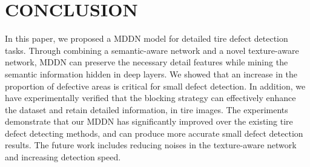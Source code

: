 \documentclass{article}
\begin{document}

%
%
%




\section{CONCLUSION}
\label{sec:typestyle}

In this paper, we proposed a MDDN model for detailed tire defect detection tasks. Through combining a semantic-aware network and a novel texture-aware network, MDDN can preserve the necessary detail features while mining the semantic information hidden in deep layers. We showed that an increase in the proportion of defective areas is critical for small defect detection. In addition, we have experimentally verified that the blocking strategy can effectively enhance the dataset and retain detailed information, in tire images. The experiments demonstrate that our MDDN has significantly improved over the existing tire defect detecting methods, and can produce more accurate small defect detection results. The future work includes reducing noises in the texture-aware network and increasing detection speed.


\vfill\pagebreak






\end{document}
